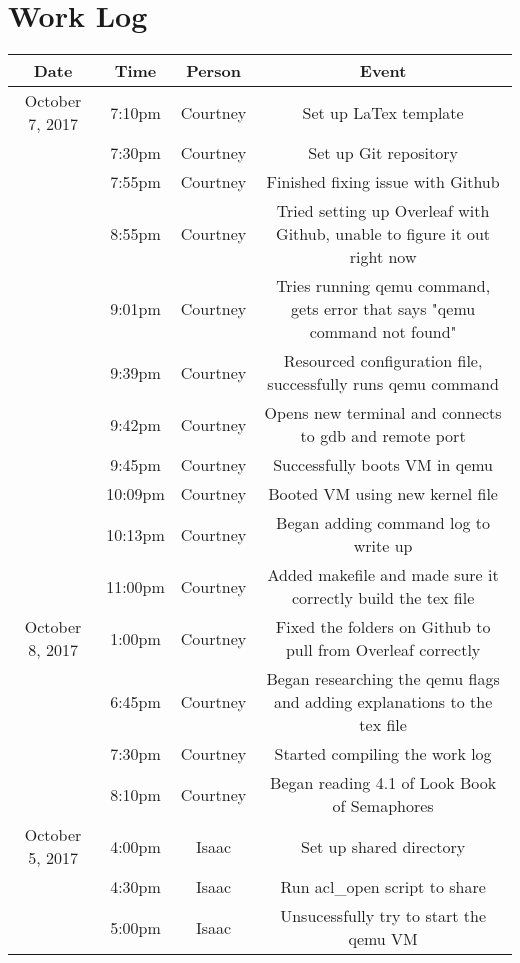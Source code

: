 \documentclass[letterpaper,10pt,draftclsnofoot,onecolumn,titlepage]{IEEEtran}
\begin{document}
\section{Work Log}
\begin{center}
\begin{tabular}{ c c c c }
 Date  & Time & Person & Event \\ \hline
 October 7, 2017 & 7:10pm & Courtney & Set up LaTex template \\  
 				 & 7:30pm & Courtney & Set up Git repository \\
                 & 7:55pm & Courtney & Finished fixing issue with Github \\
                 & 8:55pm & Courtney & Tried setting up Overleaf with Github, unable to figure it out right now \\
                 & 9:01pm & Courtney & Tries running qemu command, gets error that says "qemu command not found" \\
                 & 9:39pm & Courtney & Resourced configuration file, successfully runs qemu command \\
                 & 9:42pm & Courtney & Opens new terminal and connects to gdb and remote port \\
                 & 9:45pm & Courtney & Successfully boots VM in qemu \\
                 & 10:09pm & Courtney & Booted VM using new kernel file \\
                 & 10:13pm & Courtney & Began adding command log to write up\\
                 & 11:00pm & Courtney & Added makefile and made sure it correctly build the tex file \\ \hline
 October 8, 2017 & 1:00pm & Courtney & Fixed the folders on Github to pull from Overleaf correctly \\
 				 & 6:45pm & Courtney & Began researching the qemu flags and adding explanations to the tex file \\
                 & 7:30pm & Courtney & Started compiling the work log \\
                 & 8:10pm & Courtney & Began reading 4.1 of Look Book of Semaphores \\ \hline
 October 5, 2017 & 4:00pm & Isaac & Set up shared directory \\
   		 & 4:30pm & Isaac & Run acl_open script to share \\
                 & 5:00pm & Isaac & Unsucessfully try to start the qemu VM \\

\end{tabular}
\end{center}
\end{document}
